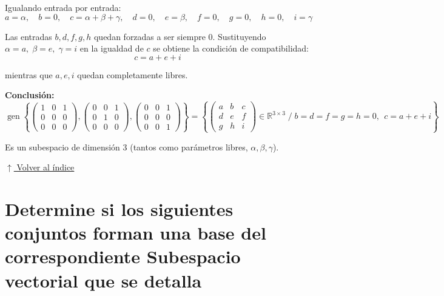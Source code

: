 \documentclass[12pt]{article}
\newcommand{\volverindice}{%
    \vspace{1em}%
    \begin{flushright}%
        \hyperlink{indice}{\small $\uparrow$ Volver al índice}%
    \end{flushright}%
}
\begin{document}
\begin{enumerate}[label=\alph*.-]
    Igualando entrada por entrada:
    \[
    a=\alpha,\quad b=0,\quad c=\alpha+\beta+\gamma,\quad d=0,\quad e=\beta,\quad f=0,\quad g=0,\quad h=0,\quad i=\gamma
    \]

    Las entradas $b,d,f,g,h$ quedan forzadas a ser siempre $0$. Sustituyendo $\alpha=a,\;\beta=e,\;\gamma=i$ en la igualdad de $c$ se obtiene la condición de compatibilidad:
    \[
    c = a+e+i
    \]

    mientras que $a,e,i$ quedan completamente libres.

    \textbf{Conclusión:}
    \[
    \operatorname{gen}\left\{ \begin{pmatrix}1&0&1\\0&0&0\\0&0&0\end{pmatrix}, \begin{pmatrix}0&0&1\\0&1&0\\0&0&0\end{pmatrix}, \begin{pmatrix}0&0&1\\0&0&0\\0&0&1\end{pmatrix} \right\}
    = \left\{ \begin{pmatrix} a&b&c \\ d&e&f \\ g&h&i \end{pmatrix} \in \mathbb{R}^{3\times3} \; \Big/ \; b=d=f=g=h=0,\;\, c=a+e+i \right\}
    \]

    Es un subespacio de dimensión $3$ (tantos como parámetros libres, $\alpha,\beta,\gamma$).
\end{enumerate}

\volverindice
\newpage

\section{Determine si los siguientes conjuntos forman una base del correspondiente Subespacio vectorial que se detalla}
\end{document}
